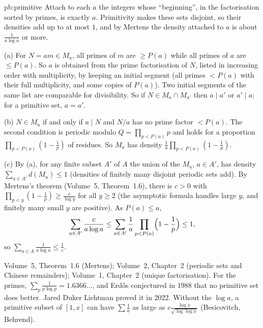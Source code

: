 \begin{solution}{pb:primitive}
\idea Attach to each $a$ the integers whose ``beginning'', in the factorisation sorted by primes, is exactly $a$. Primitivity makes these
sets disjoint, so their densities add up to at most $1$, and by Mertens the density attached to $a$ is about $\frac1{a\log a}$ or more.

\writeup (a) For $N=am\in M_a$, all primes of $m$ are $\ge P(a)$ while all primes of $a$ are $\le P(a)$. So $a$ is obtained from the prime
factorisation of $N$, listed in increasing order with multiplicity, by keeping an initial segment (all primes $<P(a)$ with their full
multiplicity, and some copies of $P(a)$). Two initial segments of the same list are comparable for divisibility. So if $N\in M_a\cap M_{a'}$
then $a\mid a'$ or $a'\mid a$; for a primitive set, $a=a'$.

(b) $N\in M_a$ if and only if $a\mid N$ and $N/a$ has no prime factor $<P(a)$. The second condition is periodic modulo $Q=\prod_{p<P(a)}p$ and holds
for a proportion $\prod_{p<P(a)}(1-\frac1p)$ of residues. So $M_a$ has density $\frac1a\prod_{p<P(a)}(1-\frac1p)$.

(c) By (a), for any finite subset $A'$ of $A$ the union of the $M_a$, $a\in A'$, has density $\sum_{a\in A'}d(M_a)\le1$ (densities of finitely many
disjoint periodic sets add). By Mertens's theorem (Volume~5, Theorem~1.6), there is $c>0$ with $\prod_{p<y}(1-\frac1p)\ge\frac c{\log y}$ for all $y\ge2$
(the asymptotic formula handles large $y$, and finitely many small $y$ are positive). As $P(a)\le a$,
\[
\sum_{a\in A'}\frac c{a\log a}\le\sum_{a\in A'}\frac1a\prod_{p<P(a)}\Bigl(1-\frac1p\Bigr)\le1,
\]
so $\sum_{a\in A}\frac1{a\log a}\le\frac1c$.

\tools Volume~5, Theorem~1.6 (Mertens); Volume~2, Chapter~2 (periodic sets and Chinese remainders); Volume~1, Chapter~2 (unique
factorisation).
\leads For the primes, $\sum_p\frac1{p\log p}=1.6366\ldots$, and Erdős conjectured in 1988 that no primitive set does better. Jared Duker
Lichtman proved it in 2022. Without the $\log a$, a primitive subset of $[1,x]$ can have $\sum\frac1a$ as large as $c\frac{\log x}{\sqrt{\log\log x}}$
(Besicovitch, Behrend).
\end{solution}

